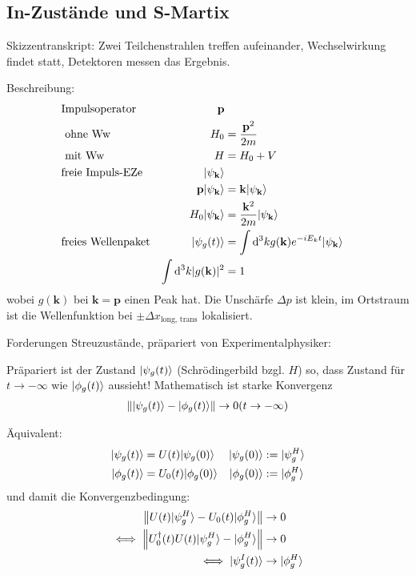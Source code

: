 \documentclass[11pt,a4paper]{report}
\newcommand{\norm}[1]{\left\lVert #1 \right\rVert}
\begin{document}
\subsection{In-Zustände und S-Martix}

Skizzentranskript: Zwei Teilchenstrahlen treffen aufeinander, Wechselwirkung findet statt, Detektoren messen das Ergebnis.

Beschreibung:
\begin{align*}
    &\text{Impulsoperator}& \mathbf{p} \\
    &\text{ ohne Ww}& H_0 &= \frac{\mathbf{p}^2}{2m} \\
    &\text{ mit Ww}& H&= H_0 + V \\
    &\text{freie Impuls-EZe} & |\psi_{\mathbf{k}}\rangle \\
    && \mathbf{p}  |\psi_{\mathbf{k}}\rangle &= \mathbf{k}  |\psi_{\mathbf{k}}\rangle \\
    && H_0  |\psi_{\mathbf{k}}\rangle &= \frac{\mathbf{k}^2}{2m}  |\psi_{\mathbf{k}}\rangle \\
    &\text{freies Wellenpaket} & |\psi_g(t)\rangle &= \int \mathrm{d}^3k g(\mathbf{k}) e^{-i E_k t} |\psi_{\mathbf{k}}\rangle \\
    && \int \mathrm{d}^3 k |g(\mathbf{k})|^2 &= 1
\end{align*}
wobei $g(\mathbf{k})$ bei $\mathbf{k}=\mathbf{p}$ einen Peak hat. 
Die Unschärfe $\Delta p$ ist klein, im Ortstraum ist die Wellenfunktion bei $\pm \Delta x_{\text{long, trans}}$ lokalisiert.

Forderungen Streuzustände, präpariert von Experimentalphysiker:

Präpariert ist der Zustand $|\psi_g(t)\rangle$ (Schrödingerbild bzgl. $H$) so, dass Zustand für $t \rightarrow -\infty$ wie $|\phi_g(t)\rangle$ aussieht!
Mathematisch ist starke Konvergenz
\begin{align*}
    \norm{\ket{\psi_g(t)} - \ket{\phi_g(t)}} \rightarrow 0 (t \rightarrow - \infty)
\end{align*}

Äquivalent:
\begin{align*}
    |\psi_g(t)\rangle &= U(t) |\psi_g(0)\rangle& |\psi_g(0)\rangle &:= |\psi_g^H\rangle \\
    |\phi_g(t)\rangle &= U_0(t) |\phi_g(0)\rangle& |\phi_g(0)\rangle &:= |\phi_g^H\rangle
\end{align*}
und damit die Konvergenzbedingung:
\begin{align*}
    \norm{U(t) \ket{\psi_g^H} - U_0(t) \ket{\phi_g^H}} &\rightarrow 0 \\
    \iff \norm{U_0^\dagger(t) U(t) \ket{\psi_g^H} - \ket{\phi_g^H}} &\rightarrow 0 \\
    \iff \ket{\psi_g^I(t)} &\rightarrow \ket{\phi_g^H}
\end{align*}
\end{document}
